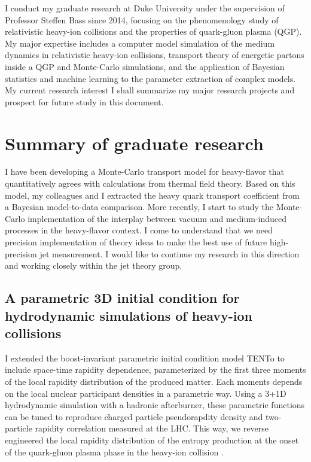 \documentclass[10pt,a4paper]{article}
\begin{document}
I conduct my graduate research at Duke University under the supervision of Professor Steffen Bass since 2014, focusing on the phenomenology study of relativistic heavy-ion collisions and the properties of quark-gluon plasma (QGP).
My major expertise includes a computer model simulation of the medium dynamics in relativistic heavy-ion collisions, transport theory of energetic partons inside a QGP and Monte-Carlo simulations, and the application of Bayesian statistics and machine learning to the parameter extraction of complex models.
My current research interest 
I shall summarize my major research projects and prospect for future study in this document.


\section{Summary of graduate research}
I have been developing a Monte-Carlo transport model for heavy-flavor that quantitatively agrees with calculations from thermal field theory.
Based on this model, my colleagues and I extracted the heavy quark transport coefficient from a Bayesian model-to-data comparison.
More recently, I start to study the Monte-Carlo implementation of the interplay between vacuum and medium-induced processes in the heavy-flavor context.
I come to understand that we need precision implementation of theory ideas to make the best use of future high-precision jet measurement.
I would like to continue my research in this direction and working closely within the jet theory group.

\subsection{A parametric 3D initial condition for hydrodynamic simulations of heavy-ion collisions}
I extended the boost-invariant parametric initial condition model T\raisebox{-.25em}{R}ENTo to include space-time rapidity dependence, parameterized by the first three moments of the local rapidity distribution of the produced matter. Each moments depends on the local nuclear participant densities in a parametric way. Using a 3+1D hydrodynamic simulation with a hadronic afterburner, these parametric functions can be tuned to reproduce charged particle pseudorapdity density and two-particle rapidity correlation measured at the LHC. This way, we reverse engineered the local rapidity distribution of the entropy production at the onset of the quark-gluon plasma phase in the heavy-ion collision \cite{Ke:2016jrd}.
\end{document}
